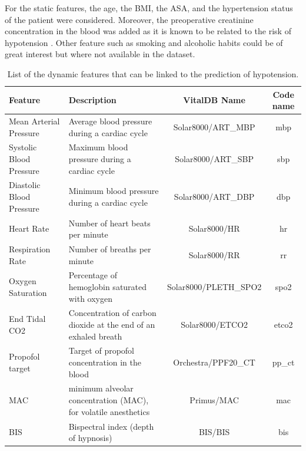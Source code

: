 \documentclass[a4paper,12pt]{article}
\begin{document}
For the static features, the age, the BMI, the ASA, and the hypertension status of the patient were considered. Moreover, the preoperative
creatinine concentration in the blood was added as it is known to be related to the risk of hypotension \cite{owensArterialHypotensionPrevalence2000a}. Other feature such as smoking and alcoholic habits could be of great interest but where not available in the dataset. \medskip
\begin{table}
\small
\begin{center}
\center
{}
\begin{tabular}{p{}|p{}|c|c}
\textbf{Feature} & \textbf{Description} & \textbf{VitalDB Name} & \textbf{Code name} \\
\midrule
Mean Arterial Pressure & Average blood pressure during a cardiac cycle & Solar8000/ART\_MBP & mbp\\
Systolic Blood Pressure & Maximum blood pressure during a cardiac cycle & Solar8000/ART\_SBP & sbp \\
Diastolic Blood Pressure & Minimum blood pressure during a cardiac cycle & Solar8000/ART\_DBP & dbp \\
Heart Rate & Number of heart beats per minute & Solar8000/HR & hr\\
Respiration Rate & Number of breaths per minute & Solar8000/RR & rr\\
Oxygen Saturation & Percentage of hemoglobin saturated with oxygen & Solar8000/PLETH\_SPO2 & spo2 \\
End Tidal CO2 & Concentration of carbon dioxide at the end of an exhaled breath & Solar8000/ETCO2 & etco2 \\
Propofol target & Target of propofol concentration in the blood & Orchestra/PPF20\_CT & pp\_ct\\
 MAC & minimum alveolar concentration (MAC), for volatile anesthetics &  Primus/MAC & mac\\
 BIS & Bispectral index (depth of hypnosis) & BIS/BIS & bis
\end{tabular}
\caption{List of the dynamic features that can be linked to the prediction of hypotension.}
\end{center}
\end{table}
\end{document}
